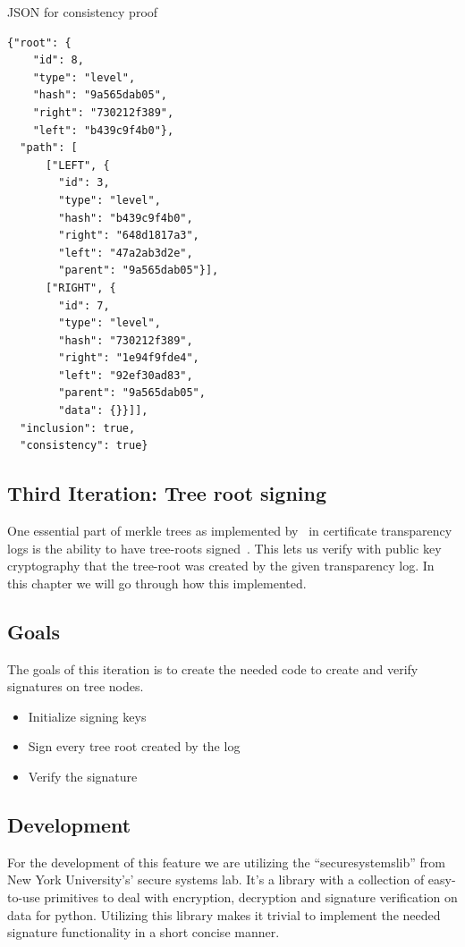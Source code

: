\documentclass[../Main/thesis.tex]{subfiles}
\begin{document}
\begin{listing}[H]
\caption{JSON for consistency proof}
\label{lst:consistency proof}
\begin{verbatim}
{"root": {
    "id": 8,
    "type": "level",
    "hash": "9a565dab05",
    "right": "730212f389",
    "left": "b439c9f4b0"},
  "path": [
      ["LEFT", {
        "id": 3,
        "type": "level",
        "hash": "b439c9f4b0",
        "right": "648d1817a3",
        "left": "47a2ab3d2e",
        "parent": "9a565dab05"}],
      ["RIGHT", {
        "id": 7,
        "type": "level",
        "hash": "730212f389",
        "right": "1e94f9fde4",
        "left": "92ef30ad83",
        "parent": "9a565dab05",
        "data": {}}]],
  "inclusion": true,
  "consistency": true}
\end{verbatim}
\end{listing}

\subsection{Third Iteration: Tree root signing}%
\label{sub:tree_root_signing}
One essential part of merkle trees as implemented
by~\citeauthor{b.-laurie-a.-langley-e.kaster-google-2013} in certificate
transparency logs is the ability to have tree-roots
signed~\cite{b.-laurie-a.-langley-e.kaster-google-2013}. This lets us verify
with public key cryptography that the tree-root was created by the given
transparency log. In this chapter we will go through how this implemented.

\subsection*{Goals}%
\label{sub:third_iteration_goals}

The goals of this iteration is to create the needed code to create and verify
signatures on tree nodes.

\begin{itemize}
    \item Initialize signing keys
    \item Sign every tree root created by the log
    \item Verify the signature
\end{itemize}

\subsection*{Development}%
\label{sub:third_iteration_development}
For the development of this feature we are utilizing the ``securesystemslib'' from
New York University's' secure systems lab. It's a library with a collection of
easy-to-use primitives to deal with encryption, decryption and signature
verification on data for python. Utilizing this library makes it trivial to
implement the needed signature functionality in a short concise manner.
\end{document}
